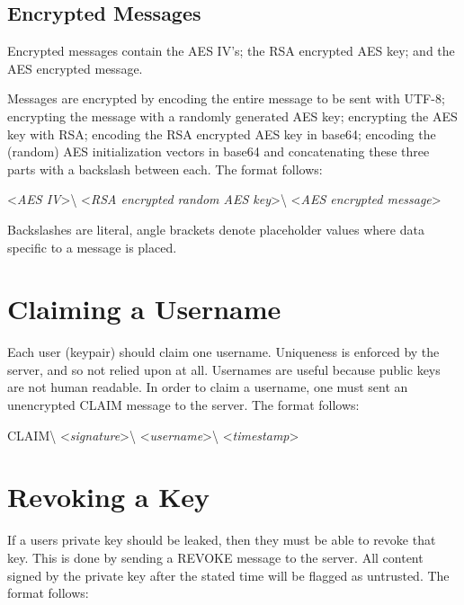 
\subsection{Encrypted Messages}
Encrypted messages contain the AES IV's; the RSA encrypted AES key; and the AES
encrypted message.

Messages are encrypted by encoding the entire message to be sent with UTF-8;
encrypting the message with a randomly generated AES key; encrypting the AES key
with RSA; encoding the RSA encrypted AES key in base64; encoding the (random)
AES initialization vectors in base64 and concatenating these three parts with a
backslash between each. The format follows:

\begin{center}
\textless \textit{AES IV}\textgreater\textbackslash
\textless \textit{RSA encrypted random AES key}\textgreater\textbackslash
\textless \textit{AES encrypted message}\textgreater
\end{center}

Backslashes are literal, angle brackets denote placeholder values where data
specific to a message is placed.


\section{Claiming a Username}
Each user (keypair) should claim one username. Uniqueness is enforced by the
server, and so not relied upon at all. Usernames are useful because public keys
are not human readable. In order to claim a username, one must sent an
unencrypted CLAIM message to the server. The format follows:

\begin{center}
CLAIM\textbackslash
\textless \textit{signature}\textgreater\textbackslash
\textless \textit{username}\textgreater\textbackslash
\textless \textit{timestamp}\textgreater
\end{center}

\section{Revoking a Key}
If a users private key should be leaked, then they must be able to revoke that
key. This is done by sending a REVOKE message to the server. All content signed
by the private key after the stated time will be flagged as untrusted. The
format follows:

